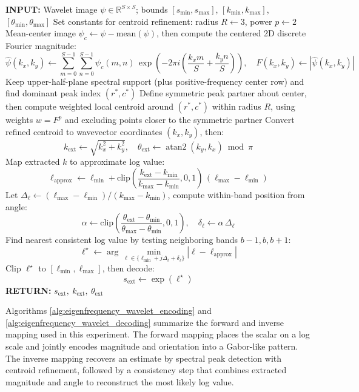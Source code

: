 \documentclass[preprint,review,12pt,numafflabel]{elsarticle}
\begin{document}
\begin{algorithm}[H]
\caption{Scalar Wavelet Decoding}
\label{alg:eigenfrequency_wavelet_decoding}
\begin{algorithmic}[1]
\STATE \textbf{INPUT:} Wavelet image \( \psi \in \mathbb{R}^{S\times S} \); bounds \( [s_{\min}, s_{\max}] \), \( [k_{\min}, k_{\max}] \), \( [\theta_{\min}, \theta_{\max}] \)
\STATE Set constants for centroid refinement: radius \(R\leftarrow 3\), power \(p\leftarrow 2\)
\STATE Mean-center image \( \psi_c \leftarrow \psi - \mathrm{mean}(\psi) \), then compute the centered 2D discrete Fourier magnitude:
\[
\hat{\psi}(k_x,k_y)\leftarrow \sum_{m=0}^{S-1}\sum_{n=0}^{S-1}\psi_c(m,n)\,
\exp\!\left(-2\pi i\!\left(\frac{k_x m}{S}+\frac{k_y n}{S}\right)\right),\quad
F(k_x,k_y)\leftarrow |\hat{\psi}(k_x,k_y)|
\]
\STATE Keep upper-half-plane spectral support (plus positive-frequency center row) and find dominant peak index \( (r^{*},c^{*}) \)
\STATE Define symmetric peak partner about center, then compute weighted local centroid around \( (r^{*},c^{*}) \) within radius \(R\), using weights \(w=F^p\) and excluding points closer to the symmetric partner
\STATE Convert refined centroid to wavevector coordinates \( (k_x,k_y) \), then:
\[
k_{\mathrm{ext}} \leftarrow \sqrt{k_x^2+k_y^2},\quad
\theta_{\mathrm{ext}} \leftarrow \operatorname{atan2}(k_y,k_x)\bmod \pi
\]
\STATE Map extracted \(k\) to approximate log value:
\[
\ell_{\mathrm{approx}} \leftarrow \ell_{\min} + \mathrm{clip}\!\left(\frac{k_{\mathrm{ext}}-k_{\min}}{k_{\max}-k_{\min}},0,1\right)\,(\ell_{\max}-\ell_{\min})
\]
\STATE Let \( \Delta_\ell \leftarrow (\ell_{\max}-\ell_{\min})/(k_{\max}-k_{\min}) \), compute within-band position from angle:
\[
\alpha \leftarrow \mathrm{clip}\!\left(\frac{\theta_{\mathrm{ext}}-\theta_{\min}}{\theta_{\max}-\theta_{\min}},0,1\right),\quad
\delta_\ell \leftarrow \alpha\,\Delta_\ell
\]
\STATE Find nearest consistent log value by testing neighboring bands \(b-1,b,b+1\):
\[
\ell^\star \leftarrow \arg\min_{\ell \in \{\ell_{\min} + j\Delta_\ell + \delta_\ell\}} |\ell-\ell_{\mathrm{approx}}|
\]
\STATE Clip \( \ell^\star \) to \( [\ell_{\min},\ell_{\max}] \), then decode:
\[
s_{\mathrm{ext}} \leftarrow \exp(\ell^\star)
\]
\STATE \textbf{RETURN:} \( s_{\mathrm{ext}},\ k_{\mathrm{ext}},\ \theta_{\mathrm{ext}} \)
\end{algorithmic}
\end{algorithm}

Algorithms \ref{alg:eigenfrequency_wavelet_encoding} and \ref{alg:eigenfrequency_wavelet_decoding} summarize the forward and inverse mapping used in this experiment. The forward mapping places the scalar on a log scale and jointly encodes magnitude and orientation into a Gabor-like pattern. The inverse mapping recovers an estimate by spectral peak detection with centroid refinement, followed by a consistency step that combines extracted magnitude and angle to reconstruct the most likely log value.
\end{document}
